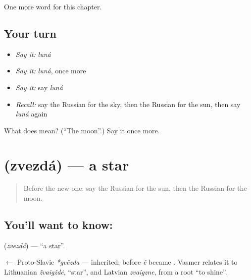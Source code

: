 \begin{grammarlens}[title={What you've built}]
One more word for this chapter.
\end{grammarlens}

\subsection*{Your turn}
\begin{itemize}
\raggedright
  \item \emph{Say it:} \emph{luná}
  \item \emph{Say it:} \emph{luná}, once more
  \item \emph{Say it:} say \emph{luná}
  \item \emph{Recall:} say the Russian for the sky, then the Russian for the sun, then say \emph{luná} again
\end{itemize}

\begin{tcolorbox}[breakable,colback=teal!4,colframe=teal!35!black,title={Before you move on}]
What does  mean? (\textquotedblleft{}The moon\textquotedblright{}.) Say it once more.
\end{tcolorbox}
\section[\texorpdfstring{\ru{звезда} (zvezdá)}{звезда (zvezdá)}]{ (zvezdá) — a star}

\label{lesson:RU-C58-star}



\begin{quote}
Before the new one: say the Russian for the sun, then the Russian for the moon.
\end{quote}

\subsection*{You'll want to know: }
\textbf{} (\emph{zvezdá}) — \textquotedblleft{}a star\textquotedblright{}.

\begin{cousinweb}
\textbf{} $\leftarrow$ Proto-Slavic \emph{*gvězda} — inherited; \emph{} before \emph{ě} became \emph{}. Vasmer relates it to Lithuanian \emph{žvaigždė}, \textquotedblleft{}star\textquotedblright{}, and Latvian \emph{zvaigzne}, from a root \textquotedblleft{}to shine\textquotedblright{}.
\end{cousinweb}

